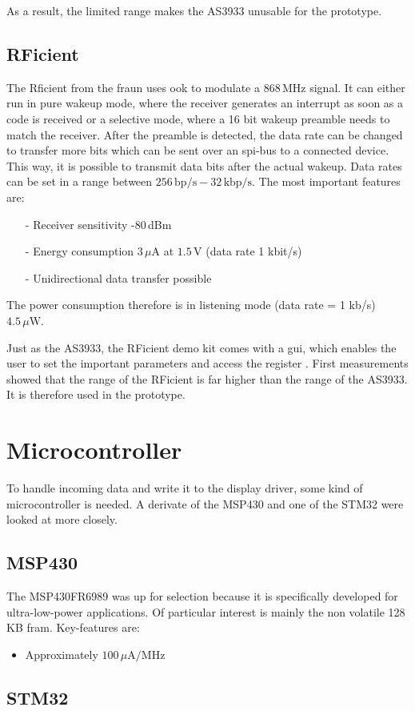 As a result, the limited range makes the AS3933 unusable for the prototype. 

\subsection{RFicient}
The Rficient from the \acs{fraun} uses \acs{ook} to modulate a 868\,MHz signal.
It can either run in pure wakeup mode, where the receiver generates an interrupt as soon as a code is received or a selective mode, where a 16 bit wakeup preamble needs to match the receiver. 
After the preamble is detected, the data rate can be changed to transfer more bits which can be sent over an \acs{spi}-bus to a connected device.
This way, it is possible to transmit data bits after the actual wakeup.
Data rates can be set in a range between $256\,\text{bp/s}-32\,\text{kbp/s}$.
The most important features are:
\begin{itemize}
	\item[-] Receiver sensitivity -80\,dBm
	\item[-] Energy consumption $3\,\mu\text{A}$ at $1.5\,\text{V}$ (data rate 1 kbit/s)
	\item[-] Unidirectional data transfer possible	
\end{itemize}
The power consumption therefore is in listening mode (data rate = 1 kb/s) $4.5\,\mu\text{W}$.

Just as the AS3933, the RFicient demo kit comes with a \acs{gui}, which enables the user to set the important parameters and access the register \cite{rficient}.
First measurements showed that the range of the RFicient is far higher than the range of the AS3933.
It is therefore used in the prototype.

\section{Microcontroller}
To handle incoming data and write it to the display driver, some kind of microcontroller is needed.
A derivate of the MSP430 and one of the STM32 were looked at more closely.

\subsection{MSP430}
The MSP430FR6989 was up for selection because it is specifically developed for ultra-low-power applications.
Of particular interest is mainly the non volatile 128\,KB \acf{fram}.
Key-features are:
\begin{itemize}
	\item Approximately  $100\,\mu\text{A}/\text{MHz}$ 
\end{itemize}


\subsection{STM32}